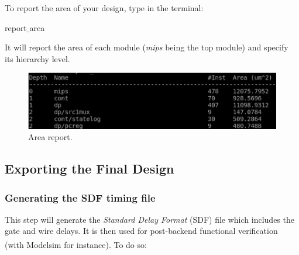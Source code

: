 To report the area of your design, type in the terminal:
\begin{codeline}
	report$\_$area
\end{codeline}
It will report the area of each module (\textit{mips} being the top module) and specify its hierarchy level.

\begin{figure}[!h]
	\centering
	\includegraphics[scale=0.45]{figures/lab5_backend/report_area_inno}
		\caption{Area report.}
\end{figure}


\subsection{Exporting the Final Design}

\subsubsection{Generating the SDF timing file}
This step will generate the \textit{Standard Delay Format} (SDF) file which includes the gate and wire delays. It is then used for post-backend functional verification (with Modelsim\textsuperscript{\tiny\textregistered} for instance). To do so:

